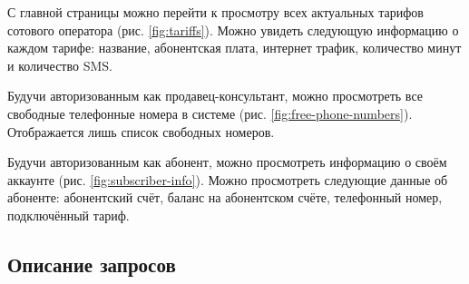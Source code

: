 С главной страницы можно перейти к просмотру всех актуальных тарифов сотового оператора (рис. \ref{fig:tariffs}). Можно увидеть следующую информацию о каждом тарифе: название, абонентская плата, интернет трафик, количество минут и количество SMS.

Будучи авторизованным как продавец-консультант, можно просмотреть все свободные телефонные номера в системе (рис. \ref{fig:free-phone-numbers}). Отображается лишь список свободных номеров.

Будучи авторизованным как абонент, можно просмотреть информацию о своём аккаунте (рис. \ref{fig:subscriber-info}). Можно просмотреть следующие данные об абоненте: абонентский счёт, баланс на абонентском счёте, телефонный номер, подключённый тариф.


\subsection{Описание запросов}


